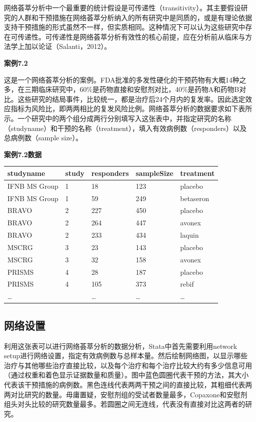 \documentclass[
  chinese-hans,
  letterpaper,
  DIV=11,
  numbers=noendperiod]{scrreprt}
\newcounter{none} %
\begin{document}
网络荟萃分析中一个最重要的统计假设是可传递性（transitivity）。其主要假设研究的人群和干预措施在网络荟萃分析纳入的所有研究中是同质的，或是有理论依据支持干预措施的形式虽然不一样，但实质相同。这种情况下可以认为这些研究中存在可传递性。可传递性是网络荟萃分析有效性的核心前提，应在分析前从临床与方法学上加以论证（Salanti，2012）。

\textbf{案例7.2}

这是一个网络荟萃分析的案例。FDA批准的多发性硬化的干预药物有大概14种之多，在三期临床研究中，60\%是药物直接和安慰剂对比，40\%是药物A和药物B对比。这些研究的结局事件，比较统一，都是治疗后24个月内的复发率。因此选定效应指标为风险比，即两两相比的复发风险比例。网络荟萃分析的数据要求如下表所示。一个研究中的两个组分成两行分别填写入这张表中，并指定研究的名称（studyname）和干预的名称（treatment），填入有效病例数（responders）以及总病例数（sample
size）。

\textbf{案例7.2数据}

{\def\LTcaptype{none} %
\begin{longtable}[]{@{}lllll@{}}
\toprule\noalign{}
studyname & study & responders & sampleSize & treatment \\
\midrule\noalign{}
\endhead
\bottomrule\noalign{}
\endlastfoot
IFNB MS Group & 1 & 18 & 123 & placebo \\
IFNB MS Group & 1 & 59 & 249 & betaseron \\
BRAVO & 2 & 227 & 450 & placebo \\
BRAVO & 2 & 264 & 447 & avonex \\
BRAVO & 2 & 233 & 434 & laquin \\
MSCRG & 3 & 23 & 143 & placebo \\
MSCRG & 3 & 32 & 158 & avonex \\
PRISMS & 4 & 28 & 187 & placebo \\
PRISMS & 4 & 105 & 373 & rebif \\
\ldots{} & & \ldots{} & \ldots{} & \ldots{} \\
\end{longtable}
}

\subsection{网络设置}\label{ux7f51ux7edcux8bbeux7f6e}

利用这张表可以进行网络荟萃分析的数据分析，Stata中首先需要利用network
setup进行网络设置，指定有效病例数与总样本量。然后绘制网络图，以显示哪些治疗与其他哪些治疗直接比较，以及每个治疗和每个治疗比较大约有多少信息可用（通过权重和着色显示证据数量和质量）。图中蓝色圆圈代表干预的方法，其大小代表该干预措施的病例数。黑色连线代表两两干预之间的直接比较，其粗细代表两两对比研究的数量。毋庸置疑，安慰剂组的受试者数量最多，Copaxone和安慰剂组头对头比较的研究数量最多。若圆圈之间无连线，代表没有直接对比这两者的研究。
\end{document}
